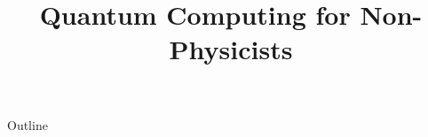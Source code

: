 \documentclass[xcolor=dvipsnames,compress,t,pdf,9pt]{beamer}
\title[\insertframenumber /\inserttotalframenumber]{Quantum Computing for Non-Physicists}
\begin{document}
	\begin{frame}
	\titlepage
	\end{frame}

	\begin{frame}{Outline}
	    \tableofcontents
	\end{frame}

	
	
	
	
\end{document}
